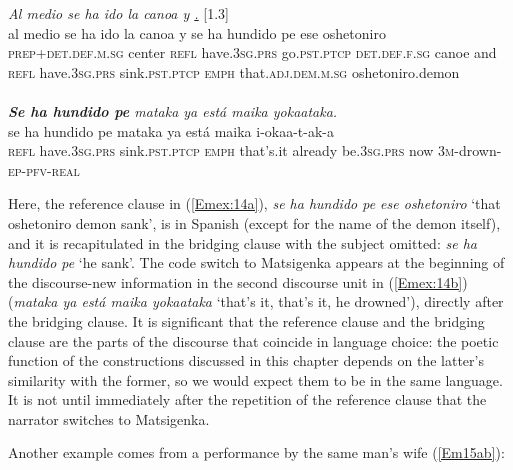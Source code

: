 \documentclass[output=paper]{LSP/langsci}
\begin{document}
\pagebreak
\begin{exe}
\ex \label{Em14ab}
\begin{xlist}
\ex \label{Emex:14a}
\glt \textit{ Al medio se ha ido la canoa y \underline{.}} [1.3]\\
\gll al medio se ha ido la canoa y se ha hundido pe ese oshetoniro\\
 \textsc{prep+det.def.m.sg} center \textsc{refl} have\textsc{.3sg.prs} go\textsc{.pst.ptcp} \textsc{det.def.f.sg} canoe and \textsc{refl} have\textsc{.3sg.prs} sink\textsc{.pst.ptcp} \textsc{emph} that\textsc{.adj.dem.m.sg} oshetoniro.demon\\
\glt {}\\
\ex \label{Emex:14b}
\glt \textit{\textbf{Se ha hundido pe} mataka ya está maika yokaataka.}\\
\gll se ha hundido pe mataka ya está maika i-okaa-t-ak-a\\     	      
    \textsc{refl} have\textsc{.3sg.prs} sink\textsc{.pst.ptcp} \textsc{emph} that’s.it already be\textsc{.3sg.prs} now \textsc{3m-}drown\textsc{-ep-pfv-real}\\
\glt {}
\end{xlist}
\end{exe}

Here, the reference clause in (\ref{Emex:14a}), \textit{se ha hundido pe ese oshetoniro} `that oshetoniro demon sank', is in Spanish (except for the name of the demon itself), and it is recapitulated in the bridging clause with the subject omitted: \textit{se ha hundido pe} `he sank'. The code switch to Matsigenka appears at the beginning of the discourse-new information in the second discourse unit in (\ref{Emex:14b}) (\textit{mataka ya está maika yokaataka} `that’s it, that’s it, he drowned'), directly after the bridging clause. It is significant that the reference clause and the bridging clause are the parts of the discourse that coincide in language choice: the poetic function of the constructions discussed in this chapter depends on the latter’s similarity with the former, so we would expect them to be in the same language. It is not until immediately after the repetition of the reference clause that the narrator switches to Matsigenka.

Another example comes from a performance by the same man’s wife (\ref{Em15ab}): 
\end{document}
